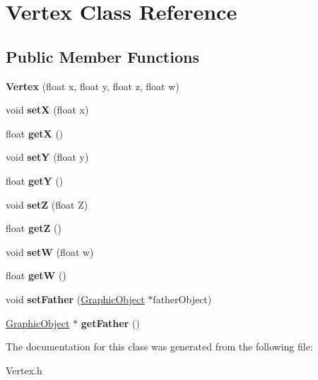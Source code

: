 \hypertarget{class_vertex}{}\section{Vertex Class Reference}
\label{class_vertex}
\subsection*{Public Member Functions}
\begin{DoxyCompactItemize}
\item 
\hypertarget{class_vertex_ad446ed10c1126c76f728a5f045942a9b}{}{\bfseries Vertex} (float x, float y, float z, float w)\label{class_vertex_ad446ed10c1126c76f728a5f045942a9b}

\item 
\hypertarget{class_vertex_a3f392a14156b214d85dd1d61f75eee57}{}void {\bfseries set\+X} (float x)\label{class_vertex_a3f392a14156b214d85dd1d61f75eee57}

\item 
\hypertarget{class_vertex_aa78d4c3433559e6e50260240c49a3d03}{}float {\bfseries get\+X} ()\label{class_vertex_aa78d4c3433559e6e50260240c49a3d03}

\item 
\hypertarget{class_vertex_a4a12cfff83ad5b29b0b453944d124d2a}{}void {\bfseries set\+Y} (float y)\label{class_vertex_a4a12cfff83ad5b29b0b453944d124d2a}

\item 
\hypertarget{class_vertex_a12facdc9f554fd718e449f2aa2eefeaf}{}float {\bfseries get\+Y} ()\label{class_vertex_a12facdc9f554fd718e449f2aa2eefeaf}

\item 
\hypertarget{class_vertex_a0e565c04bfcec60f604c9a08767480f8}{}void {\bfseries set\+Z} (float Z)\label{class_vertex_a0e565c04bfcec60f604c9a08767480f8}

\item 
\hypertarget{class_vertex_a258fea59f7c07f4e8784fc90c6ac7cb3}{}float {\bfseries get\+Z} ()\label{class_vertex_a258fea59f7c07f4e8784fc90c6ac7cb3}

\item 
\hypertarget{class_vertex_a70ef5f27d5a8a77c96c67651dc18dbb4}{}void {\bfseries set\+W} (float w)\label{class_vertex_a70ef5f27d5a8a77c96c67651dc18dbb4}

\item 
\hypertarget{class_vertex_a6957f8fb928fb151b260efc8dfe10455}{}float {\bfseries get\+W} ()\label{class_vertex_a6957f8fb928fb151b260efc8dfe10455}

\item 
\hypertarget{class_vertex_abcdf8e4ffecb26b347f0b1d7e251c22f}{}void {\bfseries set\+Father} (\hyperlink{class_graphic_object}{Graphic\+Object} $\ast$father\+Object)\label{class_vertex_abcdf8e4ffecb26b347f0b1d7e251c22f}

\item 
\hypertarget{class_vertex_a7ab9c0f1ec42bc98e997190307ce8bf9}{}\hyperlink{class_graphic_object}{Graphic\+Object} $\ast$ {\bfseries get\+Father} ()\label{class_vertex_a7ab9c0f1ec42bc98e997190307ce8bf9}

\end{DoxyCompactItemize}


The documentation for this class was generated from the following file\+:\begin{DoxyCompactItemize}
\item 
Vertex.\+h\end{DoxyCompactItemize}
